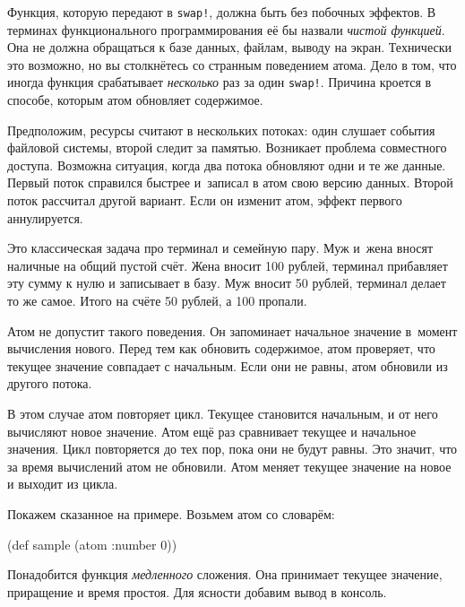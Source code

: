 
Функция, которую передают в \verb|swap!|, должна быть без побочных эффектов. В
терминах функционального программирования её бы назвали \emph{чистой функцией}.
Она не должна обращаться к базе данных, файлам, выводу на экран. Технически
это возможно, но вы столкнётесь со странным поведением атома. Дело в том,
что иногда функция срабатывает \emph{несколько} раз за один \verb|swap!|.
Причина кроется в способе, которым атом обновляет содержимое.

Предположим, ресурсы считают в нескольких потоках: один слушает события файловой
системы, второй следит за памятью. Возникает проблема совместного
доступа. Возможна ситуация, когда два потока обновляют одни и те же
данные. Первый поток справился быстрее и~записал в атом свою версию
данных. Второй поток рассчитал другой вариант. Если он изменит атом, эффект
первого аннулируется.


Это классическая задача про терминал и семейную пару. Муж и~жена вносят наличные
на общий пустой счёт. Жена вносит 100 рублей, терминал прибавляет эту сумму к
нулю и записывает в базу. Муж вносит 50 рублей, терминал делает то же
самое. Итого на счёте 50 рублей, а 100 пропали.

Атом не допустит такого поведения. Он запоминает начальное значение в~момент
вычисления нового. Перед тем как обновить содержимое, атом проверяет, что
текущее значение совпадает с начальным. Если они не равны, атом обновили из
другого потока.

В этом случае атом повторяет цикл. Текущее становится начальным, и от него
вычисляют новое значение. Атом ещё раз сравнивает текущее и начальное
значения. Цикл повторяется до тех пор, пока они не будут равны. Это значит, что за время
вычислений атом не обновили. Атом меняет текущее значение на новое и выходит из
цикла.

Покажем сказанное на примере. Возьмем атом со словарём:

\begin{english}
  \begin{clojure}
(def sample (atom {:number 0}))
  \end{clojure}
\end{english}

Понадобится функция \emph{медленного} сложения. Она принимает текущее значение,
приращение и время простоя. Для ясности добавим вывод в консоль.

\ifx\DEVICETYPE\MOBILE

